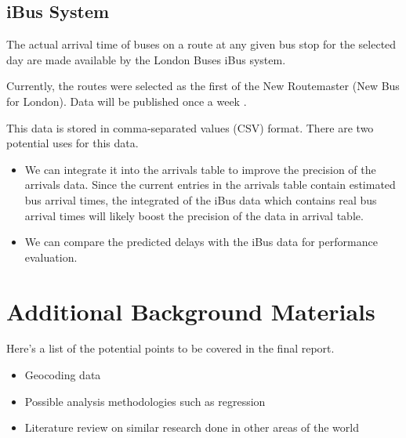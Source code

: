 
\subsection{iBus System}
The actual arrival time of buses on a route at any given bus stop for the selected day are made available by the London Buses iBus system.

Currently, the routes were selected as the first of the New Routemaster (New Bus for London). Data will be published once a week \cite{buses_performance_data}. 

This data is stored in comma-separated values (CSV) format. There are two potential uses for this data. 
\begin{itemize}
	\item We can integrate it into the arrivals table to improve the precision of the arrivals data. Since the current entries in the arrivals table contain estimated bus arrival times, the integrated of the iBus data which contains real bus arrival times will likely boost the precision of the data in arrival table.
	\item We can compare the predicted delays with the iBus data for performance evaluation. 
\end{itemize}

\section{Additional Background Materials}
Here's a list of the potential points to be covered in the final report.

\begin{itemize}
	\item Geocoding data
    \item Possible analysis methodologies such as regression
    \item Literature review on similar research done in other areas of the world
\end{itemize}


